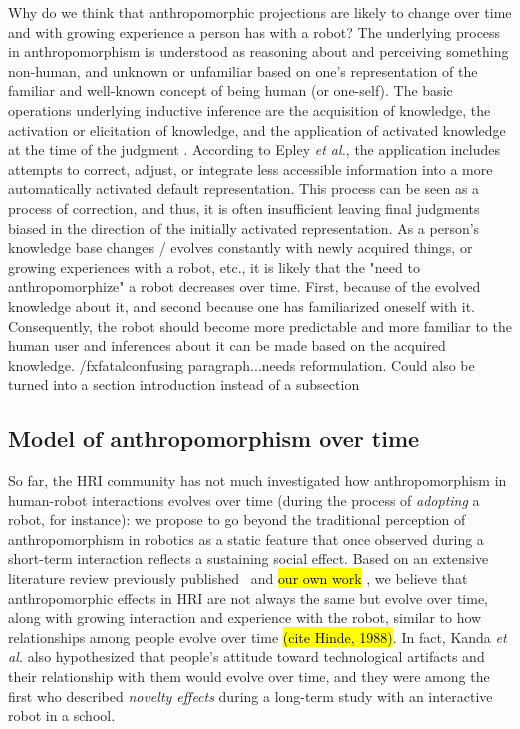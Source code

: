 \documentclass[lettersize, apacite, twoside, HRI]{apa_HRI}
\begin{document}
Why do we think that anthropomorphic projections are likely to change over time and with growing experience a person has with a robot? The underlying process in anthropomorphism is understood as reasoning about and perceiving something non-human, and unknown or unfamiliar based on one's representation of the familiar and well-known concept of being human (or one-self). The basic operations underlying inductive inference are the acquisition of knowledge, the activation or elicitation of knowledge, and the application of activated knowledge at the time of the judgment \cite{epley_when_2008}. According to Epley \textit{et al.}, the application includes attempts to correct, adjust, or integrate less accessible information into a more automatically activated default representation. This process can be seen as a process of correction, and thus, it is often insufficient leaving final judgments biased in the direction of the initially activated representation. As a person's knowledge base changes / evolves constantly with newly acquired things, or growing experiences with a robot, etc., it is likely that the "need to anthropomorphize" a robot decreases over time. First, because of the evolved knowledge about it, and second because one has familiarized oneself with it. Consequently, the robot should become more predictable and more familiar to the human user and inferences about it can be made based on the acquired knowledge.
/fxfatal{confusing paragraph...needs reformulation. Could also be turned into a section introduction instead of a subsection}


\subsection{Model of anthropomorphism over time}
\label{sec:modelintro}

So far, the HRI community has not much investigated how anthropomorphism in
human-robot interactions evolves over time (during the process of
\emph{adopting} a robot, for instance): we propose to go beyond the traditional
perception of anthropomorphism in robotics as a static feature that once
observed during a short-term interaction reflects a sustaining social effect.
Based on an extensive literature review previously published~\cite{fink_anthropomorphism_2012} and \hl{our own work} , we believe that anthropomorphic effects in HRI are not always the same but evolve over time, along with growing interaction
and experience with the robot, similar to how relationships among people evolve over time \hl{(cite Hinde, 1988)}. In fact, Kanda \textit{et al.} \cite{kanda_interactive_2004} also hypothesized that people's attitude toward technological artifacts and their relationship with them would evolve over time, and they were among the first who described \textit{novelty effects} during a long-term study with an interactive robot in a school.
\end{document}
